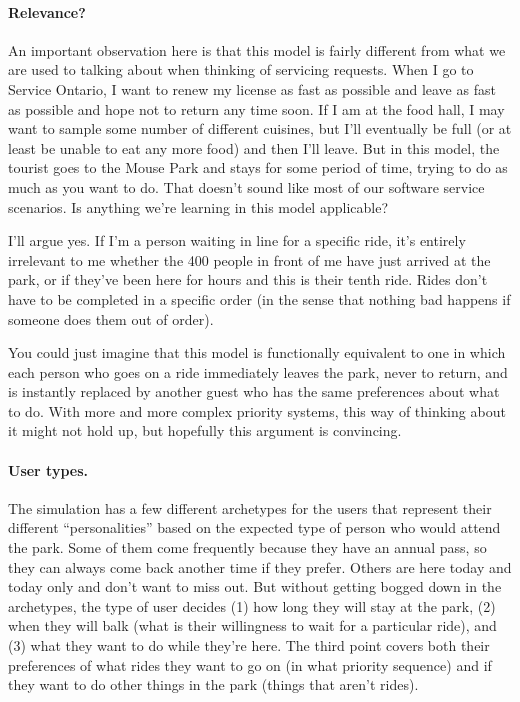 \paragraph{Relevance?}
An important observation here is that this model is fairly different from what we are used to talking about when thinking of servicing requests. When I go to Service Ontario, I want to renew my license as fast as possible and leave as fast as possible and hope not to return any time soon. If I am at the food hall, I may want to sample some number of different cuisines, but I'll eventually be full (or at least be unable to eat any more food) and then I'll leave. But in this model, the tourist goes to the Mouse Park and stays for some period of time, trying to do as much as you want to do. That doesn't sound like most of our software service scenarios. Is anything we're learning in this model applicable?

I'll argue yes. If I'm a person waiting in line for a specific ride, it's entirely irrelevant to me whether the 400 people in front of me have just arrived at the park, or if they've been here for hours and this is their tenth ride. Rides don't have to be completed in a specific order (in the sense that nothing bad happens if someone does them out of order).

You could just imagine that this model is functionally equivalent to one in which each person who goes on a ride immediately leaves the park, never to return, and is instantly replaced by another guest who has the same preferences about what to do. With more and more complex priority systems, this way of thinking about it might not hold up, but hopefully this argument is convincing.

\paragraph{User types.}
The simulation has a few different archetypes for the users that represent their different ``personalities'' based on the expected type of person who would attend the park. Some of them come frequently because they have an annual pass, so they can always come back another time if they prefer. Others are here today and today only and don't want to miss out. But without getting bogged down in the archetypes, the type of user decides (1) how long they will stay at the park, (2) when they will balk (what is their willingness to wait for a particular ride), and (3) what they want to do while they're here. The third point covers both their preferences of what rides they want to go on (in what priority sequence)  and if they want to do other things in the park (things that aren't rides).

